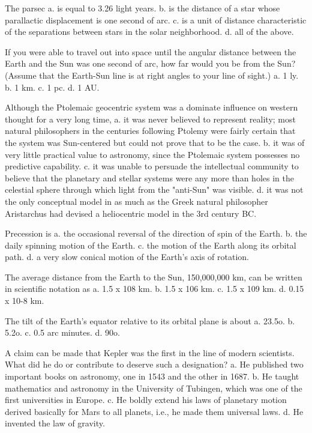     The parsec
    a. is equal to 3.26 light years.
    b. is the distance of a star whose parallactic displacement is one second of arc.
    c. is a unit of distance characteristic of the separations between stars in the solar neighborhood.
    d. all of the above.

    If you were able to travel out into space until the angular distance between the Earth and the Sun was one second of arc, how far would you be from the Sun? (Assume that the Earth-Sun line is at right angles to your line of sight.)
    a. 1 ly.
    b. 1 km.
    c. 1 pc.
    d. 1 AU.

    Although the Ptolemaic geocentric system was a dominate influence on western thought for a very long time,
    a. it was never believed to represent reality; most natural philosophers in the centuries following Ptolemy were fairly certain that the system was Sun-centered but could not prove that to be the case.
    b. it was of very little practical value to astronomy, since the Ptolemaic system possesses no predictive capability.
    c. it was unable to persuade the intellectual community to believe that the planetary and stellar systems were any more than holes in the celestial sphere through which light from the "anti-Sun" was visible.
    d. it was not the only conceptual model in as much as the Greek natural philosopher Aristarchus had devised a heliocentric model in the 3rd century BC.

    Precession is
    a. the occasional reversal of the direction of spin of the Earth.
    b. the daily spinning motion of the Earth.
    c. the motion of the Earth along its orbital path.
    d. a very slow conical motion of the Earth's axis of rotation.

    The average distance from the Earth to the Sun, 150,000,000 km, can be written in scientific notation as
    a. 1.5 x 108 km.
    b. 1.5 x 106 km.
    c. 1.5 x 109 km.
    d. 0.15 x 10-8 km.

    The tilt of the Earth's equator relative to its orbital plane is about
    a. 23.5o.
    b. 5.2o.
    c. 0.5 arc minutes.
    d. 90o.

    A claim can be made that Kepler was the first in the line of modern scientists. What did he do or contribute to deserve such a designation?
    a. He published two important books on astronomy, one in 1543 and the other in 1687.
    b. He taught mathematics and astronomy in the University of Tubingen, which was one of the first universities in Europe.
    c. He boldly extend his laws of planetary motion derived basically for Mars to all planets, i.e., he made them universal laws.
    d. He invented the law of gravity.

